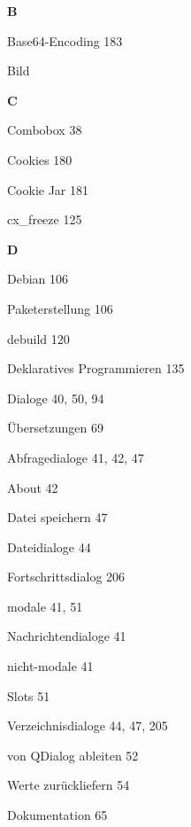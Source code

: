 \documentclass{book}
\renewcommand\indexspace{\vspace{11pt}}
\renewcommand\subitem{\par}
\begin{document}
\begin{multicols}{2}
\begin{osp-index}
  \indexspace
{\sffamily\bfseries B}\nopagebreak

  \item Base64-Encoding\hspace{1mm} 183
  \item Bild\hspace{1mm} 

  \indexspace
{\sffamily\bfseries C}\nopagebreak

  \item Combobox\hspace{1mm} 38
  \item Cookies\hspace{1mm} 180
    \subitem Cookie Jar\hspace{1mm} 181
  \item cx\_freeze\hspace{1mm} 125

  \indexspace
  \indexspace
{\sffamily\bfseries D}\nopagebreak

  \item Debian\hspace{1mm} 106
    \subitem Paketerstellung\hspace{1mm} 106
  \item debuild\hspace{1mm} 120
  \item Deklaratives Programmieren\hspace{1mm} 135
  \item Dialoge\hspace{1mm} 40, 50, 94
    \subitem \"Ubersetzungen\hspace{1mm} 69
    \subitem Abfragedialoge\hspace{1mm} 41, 42, 47
    \subitem About\hspace{1mm} 42
    \subitem Datei speichern\hspace{1mm} 47
    \subitem Dateidialoge\hspace{1mm} 44
    \subitem Fortschrittsdialog\hspace{1mm} 206
    \subitem modale\hspace{1mm} 41, 51
    \subitem Nachrichtendialoge\hspace{1mm} 41
    \subitem nicht-modale\hspace{1mm} 41
    \subitem Slots\hspace{1mm} 51
    \subitem Verzeichnisdialoge\hspace{1mm} 44, 47, 205
    \subitem von QDialog ableiten\hspace{1mm} 52
    \subitem Werte zur\"uckliefern\hspace{1mm} 54
  \item Dokumentation\hspace{1mm} 65


\end{osp-index}
\end{multicols}
\end{document}
